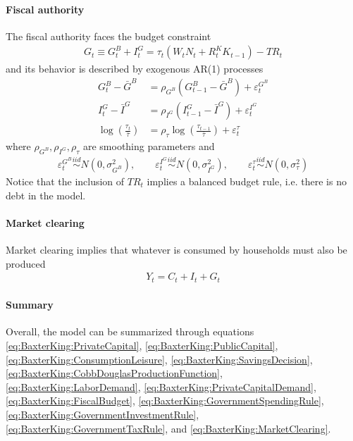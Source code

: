 \paragraph*{Fiscal authority}
The fiscal authority faces the budget constraint
\begin{align}
G_t \equiv G_t^B + I_t^G = \tau_t(W_t N_t + R^K_{t} K_{t-1}) - TR_t\label{eq:BaxterKing:FiscalBudget}
\end{align}
and its behavior is described by exogenous AR(1) processes
\begin{align}
G_t^B-\bar{G}^B &= \rho_{G^B} \left(G_{t-1}^B - \bar{G}^B\right) +  \varepsilon_t^{G^B} \label{eq:BaxterKing:GovernmentSpendingRule}\\
I_t^G-\bar{I}^G &= \rho_{I^G} \left(I_{t-1}^G - \bar{I}^G\right) +  \varepsilon_t^{I^G} \label{eq:BaxterKing:GovernmentInvestmentRule}\\
\log\left(\frac{\tau_t}{\bar{\tau}}\right) &= \rho_\tau \log\left(\frac{\tau_{t-1}}{\bar{\tau}}\right) +  \varepsilon_t^\tau \label{eq:BaxterKing:GovernmentTaxRule}
\end{align}
where $\rho_{G^B}, \rho_{I^G}, \rho_{\tau}$ are smoothing parameters and
\begin{align*}
\varepsilon_t^{G^B}\overset{iid}{\sim} N(0,\sigma_{G^B}^2), \qquad
\varepsilon_t^{I^G}\overset{iid}{\sim} N(0,\sigma_{I^G}^2), \qquad
\varepsilon_t^\tau\overset{iid}{\sim} N(0,\sigma_{\tau}^2)
\end{align*}
Notice that the inclusion of $TR_t$ implies a balanced budget rule, i.e. there is no debt in the model.

\paragraph*{Market clearing}
Market clearing implies that whatever is consumed by households must also be produced
\begin{align}
Y_t = C_t + I_t + G_t \label{eq:BaxterKing:MarketClearing}
\end{align}

\paragraph{Summary}
Overall, the model can be summarized through equations
  \eqref{eq:BaxterKing:PrivateCapital},
  \eqref{eq:BaxterKing:PublicCapital},
  \eqref{eq:BaxterKing:ConsumptionLeisure},
  \eqref{eq:BaxterKing:SavingsDecision},
  \eqref{eq:BaxterKing:CobbDouglasProductionFunction},
  \eqref{eq:BaxterKing:LaborDemand},
  \eqref{eq:BaxterKing:PrivateCapitalDemand},
  \eqref{eq:BaxterKing:FiscalBudget},
  \eqref{eq:BaxterKing:GovernmentSpendingRule},
  \eqref{eq:BaxterKing:GovernmentInvestmentRule},
  \eqref{eq:BaxterKing:GovernmentTaxRule},
  and
  \eqref{eq:BaxterKing:MarketClearing}.




